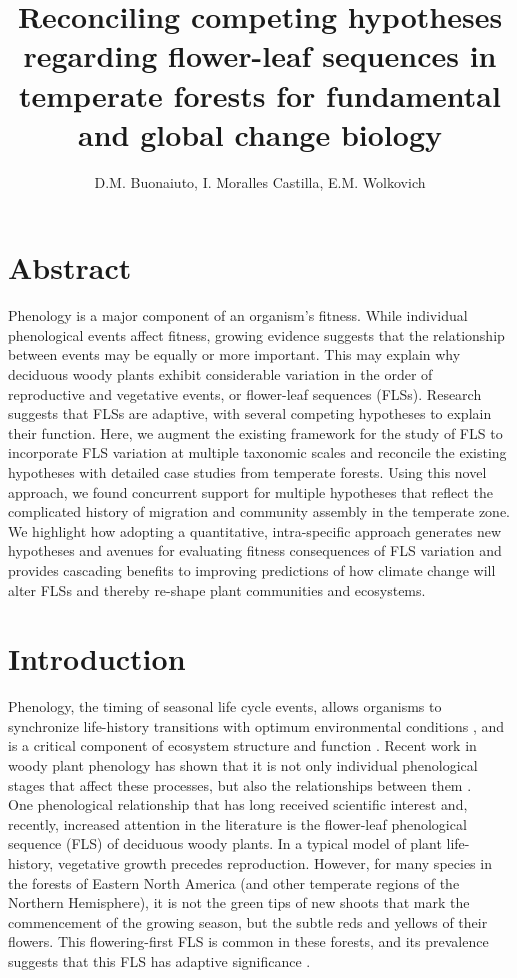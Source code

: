 \documentclass{article}
\title{Reconciling competing hypotheses regarding flower-leaf sequences in temperate forests for fundamental and global change biology}
\author{D.M. Buonaiuto, I. Moralles Castilla, E.M. Wolkovich}
\begin{document}
\maketitle
\section*{Abstract}
Phenology is a major component of an organism's fitness. While individual phenological events affect fitness, growing evidence suggests that the relationship between events may be equally or more important. This may explain why deciduous woody plants exhibit considerable variation in the order of reproductive and vegetative events, or flower-leaf sequences (FLSs). Research suggests that FLSs are adaptive, with several competing hypotheses to explain their function. Here, we augment the existing framework for the study of FLS to incorporate FLS variation at multiple taxonomic scales and reconcile the existing hypotheses with detailed case studies from temperate forests. Using this novel approach, we found concurrent support for multiple hypotheses that reflect the complicated history of migration and community assembly in the temperate zone. We highlight how adopting a quantitative, intra-specific approach generates new hypotheses and avenues for evaluating fitness consequences of FLS variation and provides cascading benefits to improving predictions of how climate change will alter FLSs and thereby re-shape plant communities and ecosystems.


\section*{Introduction}
Phenology, the timing of seasonal life cycle events, allows organisms to synchronize life-history transitions with optimum environmental conditions \citep{Forrest2010}, and is a critical component of ecosystem structure and function \citep{Cleland2007,Piao2007}. Recent work in woody plant phenology has shown that it is not only individual phenological stages that affect these processes, but also the relationships between them \citep{Ettinger2018}.\\

\noindent One phenological relationship that has long received scientific interest \citep[see][]{Robertson1895} and, recently, increased attention in the literature \citep{Savage2019, Gougherty2018} is the flower-leaf phenological sequence (FLS) of deciduous woody plants. In a typical model of plant life-history, vegetative growth precedes reproduction. However, for many species in the forests of Eastern North America (and other temperate regions of the Northern Hemisphere), it is not the green tips of new shoots that mark the commencement of the growing season, but the subtle reds and yellows of their flowers. This flowering-first FLS is common in these forests, and its prevalence suggests that this FLS has adaptive significance \citep{Rathcke_1985}.\\ 
\end{document}
